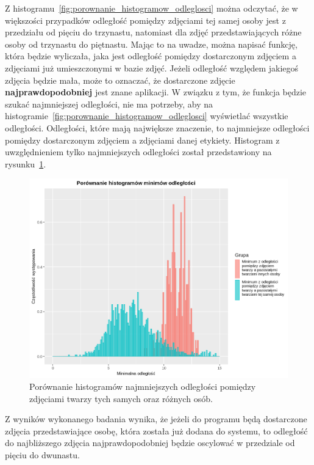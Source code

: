 Z histogramu~\ref{fig:porownanie_histogramow_odleglosci} można odczytać, że w większości
przypadków odległość pomiędzy zdjęciami tej samej osoby jest
z przedziału od pięciu do trzynastu, natomiast dla zdjęć przedstawiających różne osoby od trzynastu do piętnastu.
Mając to na uwadze, można napisać funkcję, która będzie wyliczała, jaka jest odległość pomiędzy dostarczonym zdjęciem
a zdjęciami już umieszczonymi w bazie zdjęć.
Jeżeli odległość względem jakiegoś zdjęcia będzie mała, może to oznaczać, że dostarczone
zdjęcie \textbf{najprawdopodobniej} jest znane aplikacji.
W związku z tym, że funkcja będzie szukać najmniejszej odległości, nie ma potrzeby,
aby na histogramie~\ref{fig:porownanie_histogramow_odleglosci} wyświetlać wszystkie odległości.
Odległości, które mają największe znaczenie, to najmniejsze odległości pomiędzy dostarczonym zdjęciem
a zdjęciami danej etykiety.
Histogram z uwzględnieniem tylko najmniejszych odległości został przedstawiony na
rysunku~\ref{fig:wykres_najmniejszych_odleglosc_wspolny}.

\begin{figure}[H]
    \centering
    \includegraphics[width=1\textwidth]{images/wykres_najmniejszych_odleglosc_wspolny}
    \caption{
        Porównanie histogramów najmniejszych odległości pomiędzy
        zdjęciami twarzy tych samych oraz różnych osób.
    }
    \customsource
    \label{fig:wykres_najmniejszych_odleglosc_wspolny}
\end{figure}

Z wyników wykonanego badania wynika, że jeżeli do programu będą dostarczone zdjęcia przedstawiające osobę,
która została już dodana do systemu,
to odległość do najbliższego zdjęcia najprawdopodobniej będzie oscylować w przedziale od pięciu do dwunastu.


